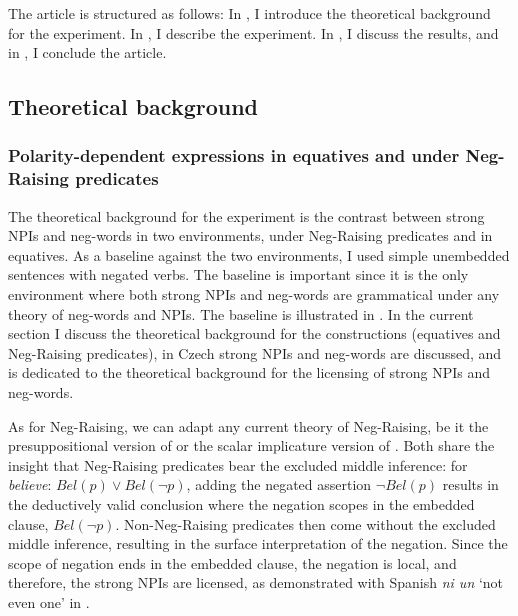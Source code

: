 \documentclass[output=paper,colorlinks,citecolor=brown]{langscibook}
\begin{document}

The article is structured as follows: In , I introduce the theoretical background for the experiment. In , I describe the experiment. In , I discuss the results, and in , I conclude the article.

\subsection{Theoretical background}\label{sec:theoretical-backgr}

\subsubsection{Polarity-dependent expressions in equatives and under Neg-Raising predicates}

The theoretical background for the experiment is the contrast between strong NPIs and neg-words in two environments, under Neg-Raising predicates and in equatives. As a baseline against the two environments, I used simple unembedded sentences with negated verbs. The baseline is important since it is the only environment where both strong NPIs and neg-words are grammatical under any theory of neg-words and NPIs. The baseline is illustrated in . In the current section I discuss the theoretical background for the constructions (equatives and Neg-Raising predicates), in  Czech strong NPIs and neg-words are discussed, and  is dedicated to the theoretical background for the licensing of strong NPIs and neg-words. 

As for Neg-Raising, we can adapt any current theory of Neg-Raising, be it the presuppositional version of \citet{gajewski2007neg} or the scalar implicature version of \citet{romoli2013scalar}. Both share the insight that Neg-Raising predicates bear the excluded middle inference: for \textit{believe}: $Bel(p) \vee Bel(\neg p)$, adding the negated assertion $\neg Bel(p)$ results in the deductively valid conclusion where the negation scopes in the embedded clause, $Bel(\neg p)$. Non-Neg-Raising predicates then come without the excluded middle inference, resulting in the surface interpretation of the negation. Since the scope of negation ends in the embedded clause, the negation is local, and therefore, the strong NPIs are licensed, as demonstrated with Spanish \textit{ni un} `not even one' in .
\end{document}

